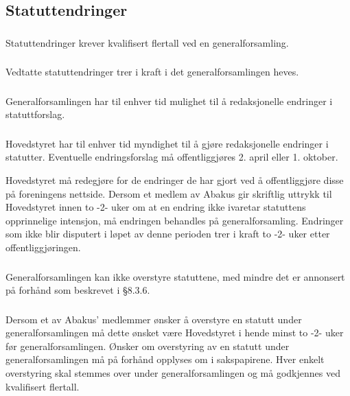 \subsection{Statuttendringer}
\subsubsection{}
Statuttendringer krever kvalifisert flertall ved en generalforsamling.

\subsubsection{}
Vedtatte statuttendringer trer i kraft i det generalforsamlingen heves.

\subsubsection{}
Generalforsamlingen har til enhver tid mulighet til å redaksjonelle endringer i
statuttforslag.

\subsubsection{}
Hovedstyret har til enhver tid myndighet til å gjøre redaksjonelle endringer i
statutter. Eventuelle endringsforslag må offentliggjøres 2. april eller 1. oktober.

Hovedstyret må redegjøre for de endringer de har gjort ved å offentliggjøre
disse på foreningens nettside. Dersom et medlem av Abakus gir skriftlig uttrykk
til Hovedstyret innen to -2- uker om at en endring ikke ivaretar statuttens
opprinnelige intensjon, må endringen behandles på generalforsamling. Endringer
som ikke blir disputert i løpet av denne perioden trer i kraft to -2- uker
etter offentliggjøringen.

\subsubsection{}
Generalforsamlingen kan ikke overstyre statuttene, med mindre det er annonsert på forhånd som beskrevet i §8.3.6.

\subsubsection{}
Dersom et av Abakus' medlemmer ønsker å overstyre en statutt under
generalforsamlingen må dette ønsket være Hovedstyret i hende minst to -2- uker
før generalforsamlingen. Ønsker om overstyring av en statutt under
generalforsamlingen må på forhånd opplyses om i sakspapirene. Hver enkelt
overstyring skal stemmes over under generalforsamlingen og må godkjennes ved
kvalifisert flertall.

